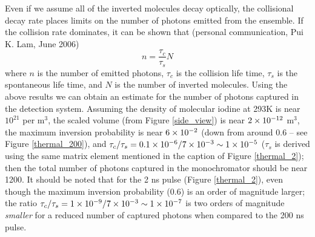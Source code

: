 Even if we assume all of the inverted molecules decay optically, the collisional decay rate places limits on the number of photons emitted from the ensemble. If the collision rate dominates, it can be shown that (personal communication, Pui K. Lam, June 2006)
\begin{equation}
n
=
\frac
{\tau_c}
{\tau_s}
N
\end{equation}
where $n$ is the number of emitted photons, $\tau_c$ is the collision life time, $\tau_s$ is the spontaneous life time, and $N$ is the number of inverted molecules. Using the above results we can obtain an estimate for the number of photons captured in the detection system. Assuming the density of molecular iodine at 293K is near $10^{21}$ per m$^3$, the scaled volume (from Figure \ref{side_view}) is near $2\times10^{-12}$ m$^3$, the maximum inversion probability is near $6\times 10^{-2}$ (down from around 0.6 -- see Figure \ref{thermal_200}), and $\tau_c/\tau_s=0.1\times10^{-6}/7\times10^{-3}\sim1\times10^{-5}$ ($\tau_s$ is derived using the same matrix element mentioned in the caption of Figure \ref{thermal_2}); then the total number of photons captured in the monochromator should be near 1200. It should be noted that for the 2 ns pulse (Figure \ref{thermal_2}), even though the maximum inversion probability (0.6) is an order of magnitude larger; the ratio $\tau_c/\tau_s=1\times10^{-9}/7\times10^{-3}\sim1\times10^{-7}$ is two orders of magnitude \emph{smaller} for a reduced number of captured photons when compared to the 200 ns pulse.
